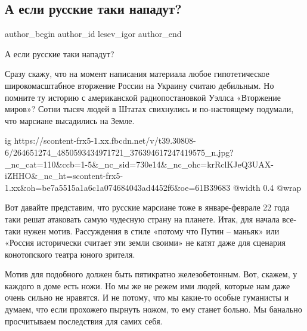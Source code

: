  
 
 
 
 
 
\subsection{А если русские таки нападут?}
\label{sec:06_12_2021.fb.lesev_igor.1.a_esli_russkie_taki_napadut}
 
\ifcmt
 author_begin
   author_id lesev_igor
 author_end
\fi

А если русские таки нападут?

Сразу скажу, что на момент написания материала любое гипотетическое
широкомасштабное вторжение России на Украину считаю дебильным. Но помните ту
историю с американской радиопостановкой Уэллса «Вторжение миров»? Сотни тысяч
людей в Штатах свихнулись и по-настоящему подумали, что марсиане высадились на
Земле.

\ifcmt
  ig https://scontent-frx5-1.xx.fbcdn.net/v/t39.30808-6/264651274_4850593434971721_376394617247419575_n.jpg?_nc_cat=110&ccb=1-5&_nc_sid=730e14&_nc_ohc=krRclKJeQ3UAX-iZHHO&_nc_ht=scontent-frx5-1.xx&oh=be7a5515a1a6c1a074684043ad4452f6&oe=61B39683
  @width 0.4
  @wrap 
\fi

Вот давайте представим, что русские марсиане тоже в январе-феврале 22 года таки
решат атаковать самую чудесную страну на планете. Итак, для начала все-таки
нужен мотив. Рассуждения в стиле «потому что Путин – маньяк» или «Россия
исторически считает эти земли своими» не катят даже для сценария конотопского
театра юного зрителя.

Мотив для подобного должен быть пятикратно железобетонным. Вот, скажем, у
каждого в доме есть ножи. Но мы же не режем ими людей, которые нам даже очень
сильно не нравятся. И не потому, что мы какие-то особые гуманисты и думаем, что
если прохожего пырнуть ножом, то ему станет больно. Мы банально просчитываем
последствия для самих себя.

